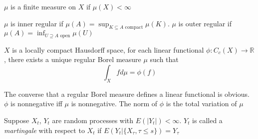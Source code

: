 \documentclass[main]{subfiles}
\begin{document}
\begin{definition}
$\mu$ is a finite measure on $X$ if $\mu(X)<\infty$
\end{definition}

\begin{definition}
$\mu$ is inner regular if $\mu(A)=\displaystyle\sup_{K\subseteq A\text{ compact}}\mu(K)$. $\mu$ is outer regular if $\mu(A)=\displaystyle\inf_{U\supseteq A\text{ open}}\mu(U)$
\end{definition}

\begin{theorem}
$X$ is a locally compact Hausdorff space, for each linear functional $\phi:C_c(X)\to\mathbb R$, there exists a unique regular Borel measure $\mu$ such that
\[\int_Xfd\mu=\phi(f)\]
\end{theorem}

\begin{note}
The converse that a regular Borel measure defines a linear functional is obvious. $\phi$ is nonnegative iff $\mu$ is nonnegative. The norm of $\phi$ is the total variation of $\mu$
\end{note}

\begin{definition}
Suppose $X_t$, $Y_t$ are random processes with $E(|Y_t|)<\infty$. $Y_t$ is called a \textit{martingale} with respect to $X_t$ if $E(Y_t|\{X_\tau,\tau\leq s\})=Y_\tau$
\end{definition}
\end{document}
